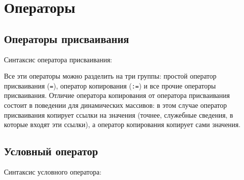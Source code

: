\documentclass[10pt]{report}
\begin{document}
\section{Операторы}

    \subsection{Операторы присваивания}

Синтаксис оператора присваивания:
\begin{center}
\textcolor{Green}{}
\end{center}

Все эти операторы можно разделить на три группы: простой оператор присваивания (\texttt{=}), оператор копирования (\texttt{:=}) и все прочие операторы присваивания.
Отличие оператора копирования от оператора присваивания состоит в поведении для динамических массивов: в этом случае оператор присваивания копирует
ссылки на значения (точнее, служебные сведения, в которые входят эти ссылки), а оператор копирования копирует сами значения. 


    \subsection{Условный оператор}
Синтаксис условного оператора:

\noindent\textcolor{Green}{}
\end{document}
